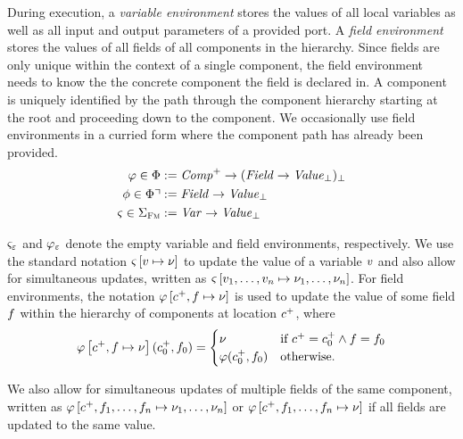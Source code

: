 \documentclass[a4paper,10pt,english]{article}
\begin{document}
During execution, a \textit{variable environment} stores the values of all local variables as well as all input and output
parameters of a provided port.
A \textit{field environment} stores the values of all fields of all components in the hierarchy. Since fields are only unique
within the context of a single component, the field environment needs to know the the concrete component the field is declared
in. A component is uniquely identified by the path through the component hierarchy starting at the root and proceeding down to the
component. We occasionally use field environments in a curried form where the component path has already been provided.
\begin{align*}
	\varphi \in \Phi &:= \mathit{Comp}^+ \rightarrow (\mathit{Field} \rightarrow \mathit{Value}_\bot)_\bot \\
	\phi \in \Phi\urcorner &:= \mathit{Field} \rightarrow \mathit{Value}_\bot \\
	\varsigma \in \Sigma_\textsc{Fm} &:= \mathit{Var} \rightarrow \mathit{Value}_\bot
\end{align*}

$\varsigma_\varepsilon$ and $\varphi_\varepsilon$ denote the empty variable and field environments, respectively. We use the standard
notation $\varsigma\left[v \mapsto \nu \right]$ to update the value of a variable $v$ and also allow for simultaneous
updates, written as $\varsigma\left[v_1, \ldots, v_n \mapsto \nu_1, \ldots, \nu_n\right]$.
For field environments, the notation $\varphi\left[c^+, f \mapsto \nu \right]$ is used to update the value of
some field $f$ within the hierarchy of components at location $c^+$, where
\begin{equation*}
	\varphi\left[c^+, f \mapsto \nu \right](c^+_0, f_0) =
		\begin{cases}
			\nu & \text{if } c^+ = c^+_0 \wedge f = f_0 \\
			\varphi(c^+_0, f_0) & \text{otherwise.}
		\end{cases}
\end{equation*}

We also allow for simultaneous updates of multiple fields of the same component, written as $\varphi\left[c^+,
f_1, \ldots, f_n \mapsto \nu_1, \ldots, \nu_n \right]$ or $\varphi\left[c^+, f_1, \ldots, f_n
\mapsto \nu \right]$ if all fields are updated to the same value.
\end{document}
